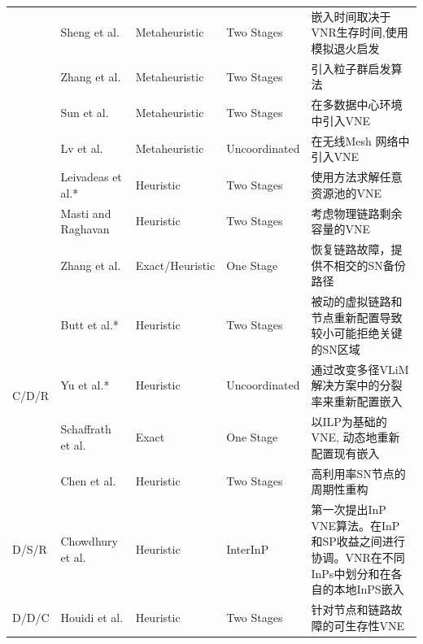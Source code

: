 \begin{longtable}[h]{@{}lm{}m{}m{}m{}}
 & Sheng et al.  \cite{zhang2011fell}  & Metaheuristic & Two Stages & 嵌入时间取决于VNR生存时间,使用模拟退火启发\\
 & Zhang et al.  \cite{zhang2013unified}  & Metaheuristic & Two Stages & 引入粒子群启发算法\\
 & Sun et al.  \cite{sun2012optimal}  & Metaheuristic & Two Stages & 在多数据中心环境中引入VNE\\
 & Lv et al.  \cite{lv2012virtual}  & Metaheuristic & Uncoordinated & 在无线Mesh 网络中引入VNE\\
 & Leivadeas et al.*  \cite{leivadeas2013efficient}  & Heuristic & Two Stages & 使用方法\cite{chowdhury2012vineyard}求解任意资源池的VNE\\
 & Masti and Raghavan  \cite{masti2012vna}  & Heuristic & Two Stages & 考虑物理链路剩余容量的VNE\\
 & Zhang et al.  \cite{zhang2012achieving}  & Exact/Heuristic & One Stage & 恢复链路故障，提供不相交的SN备份路径\\
\hline
\multirow{4}{*}{C/D/R} & Butt et al.*  \cite{butt2010topology}  & Heuristic & Two Stages & 被动的虚拟链路和节点重新配置导致较小可能拒绝关键的SN区域\\
 & Yu et al.*  \cite{yu2008rethinking}  & Heuristic & Uncoordinated & 通过改变多径VLiM 解决方案中的分裂率来重新配置嵌入\\
 & Schaffrath et al.  \cite{schaffrath2012optimizing}  & Exact& One Stage & 以ILP为基础的VNE, 动态地重新配置现有嵌入\\
 & Chen et al.  \cite{chen2011algorithm}  & Heuristic & Two Stages & 高利用率SN节点的周期性重构\\
\hline
\multirow{1}{*}{D/S/R} & Chowdhury et al.  \cite{chowdhury2010polyvine}  & Heuristic & InterInP & 第一次提出InP VNE算法。在InP 和SP收益之间进行协调。VNR在不同InPs中划分和在各自的本地InPS嵌入\\
\hline
\multirow{1}{*}{D/D/C} & Houidi et al.  \cite{houidi2010adaptive}  & Heuristic & Two Stages& 针对节点和链路故障的可生存性VNE\\
\end{longtable}
\vspace{\baselineskip}\xiaosi
\renewcommand\arraystretch{1.5}








